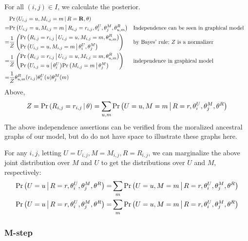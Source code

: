 \documentclass{article}
\begin{document}
For all $(i,j) \in I$, we calculate the posterior.
\begin{align}
& {{\Pr \left(   U_{i,j} = u, M_{i,j} = m  \,\middle|\,  R = {\bf R}, \theta   \right)}} \\
=& {{\Pr \left(   U_{i,j} = u, M_{i,j} = m  \,\middle|\,  R_{i,j} = r_{i,j}, \theta^U_i,
  \theta^M_j, \theta^R_{u,m}   \right)}}
&&
\text{Independence can be seen in graphical model} \\
=& \frac{1}{Z} \left(
\begin{aligned}
& {{\Pr \left(  R_{i,j} = r_{i,j}  \,\middle|\, U_{i,j} = u, M_{i,j} = m, \theta^R_{u,m}  \right)}} \\
& {{\Pr \left(  U_{i,j} = u, M_{i,j} = m \,\middle|\, \theta^U_i, \theta^M_j  \right)}}
\end{aligned} \right)
&& \text{by Bayes' rule; $Z$ is a normalizer} \\
=& \frac{1}{Z} \left(
\begin{aligned}
& {{\Pr \left(  R_{i,j} = r_{i,j}  \,\middle|\, U_{i,j} = u, M_{i,j} = m, \theta^R_{u,m}  \right)}} \\
& {{\Pr \left(  U_{i,j} = u  \,\middle|\, \theta^U_i  \right)}}
  {{\Pr \left(  M_{i,j} = m  \,\middle|\, \theta^M_j  \right)}}
\end{aligned} \right)
&& \text{independence in graphical model} \\
=& \frac{1}{Z} \theta^R_{u,m}(r_{i,j}) \theta^U_i(u) \theta^M_j(m)
\label{eq:pumrij}
\end{align}
Above,
\begin{align}
  Z = {{\Pr \left(  R_{i,j} = r_{i,j} \,\middle|\, \theta  \right)}} = \sum_{u,m} {{\Pr \left(  U = u, M = m \,\middle|\, R = r, \theta^U_i, \theta^M_j,
    \theta^R  \right)}}
\end{align}
The above independence assertions can be verified from the moralized ancestral
graphs of our model, but do do not have space to illustrate these
graphs here.

For any $i,j$,
letting $U = U_{i,j}, M = M_{i,j}, R = R_{i,j}$,
we can marginalize the above joint distribution over $M$ and $U$
to get the distributions over $U$ and $M$, respectively:
\begin{align}
  {{\Pr \left(  U = u \,\middle|\, R = r, \theta^U_i, \theta^M_j, \theta^R  \right)}}
  =& \sum_m {{\Pr \left(  U = u, M = m \,\middle|\, R = r, \theta^U_i, \theta^M_j, \theta^R  \right)}}
\\
  {{\Pr \left(  U = u \,\middle|\, R = r, \theta^U_i, \theta^M_j, \theta^R  \right)}}
  =& \sum_m {{\Pr \left(  U = u, M = m \,\middle|\, R = r, \theta^U_i, \theta^M_j, \theta^R  \right)}}
\end{align}

\subsubsection{M-step}
\end{document}
